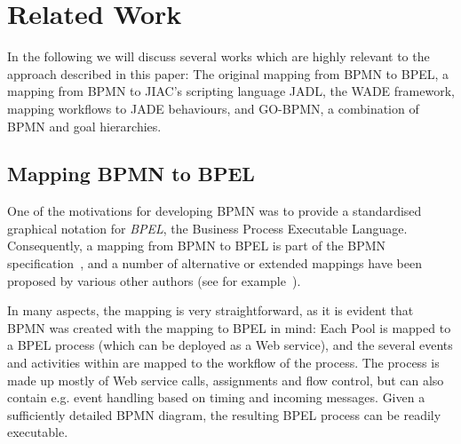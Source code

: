 

\section{Related Work}
\label{sec:related}

In the following we will discuss several works which are highly relevant to the
approach described in this paper: The original mapping from BPMN to BPEL, a
mapping from BPMN to JIAC's scripting language JADL, the WADE framework, mapping
workflows to JADE behaviours, and GO-BPMN, a combination of BPMN and goal hierarchies.



\subsection{Mapping BPMN to BPEL}

One of the motivations for developing BPMN was to provide a standardised graphical
notation for \emph{BPEL}, the Business Process Executable Language.  Consequently,
a mapping from BPMN to BPEL is part of the BPMN specification~\cite[Appendix
A]{omg2009bpmn}, and a number of alternative or extended mappings have been
proposed by various other authors (see for example~\cite{ouyang2009business}).

In many aspects, the mapping is very straightforward, as it is evident that BPMN
was created with the mapping to BPEL in mind: Each Pool is mapped to a BPEL
process (which can be deployed as a Web service), and the several events and
activities within are mapped to the workflow of the process.  The process is made
up mostly of Web service calls, assignments and flow control, but can also contain
e.g. event handling based on timing and incoming messages.  Given a sufficiently
detailed BPMN diagram, the resulting BPEL process can be readily executable.

